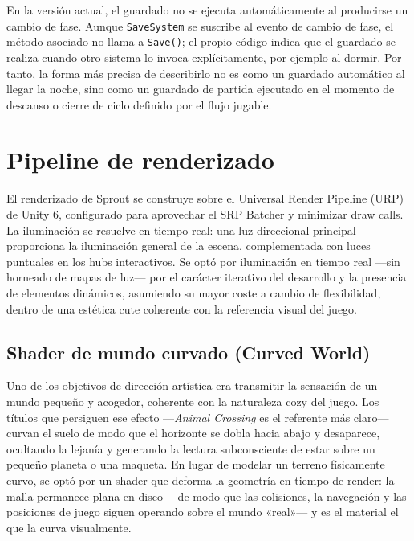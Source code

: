 \documentclass[12pt,twoside,titlepage]{report}
\begin{document}
En la versión actual, el guardado no se ejecuta automáticamente al producirse un cambio de fase. Aunque \texttt{SaveSystem} se suscribe al evento de cambio de fase, el método asociado no llama a \texttt{Save()}; el propio código indica que el guardado se realiza cuando otro sistema lo invoca explícitamente, por ejemplo al dormir. Por tanto, la forma más precisa de describirlo no es como un guardado automático al llegar la noche, sino como un guardado de partida ejecutado en el momento de descanso o cierre de ciclo definido por el flujo jugable.

\section{Pipeline de renderizado}

El renderizado de Sprout se construye sobre el Universal Render Pipeline (URP) de Unity 6, configurado para aprovechar el SRP Batcher y minimizar draw calls. La iluminación se resuelve en tiempo real: una luz direccional principal proporciona la iluminación general de la escena, complementada con luces puntuales en los hubs interactivos. Se optó por iluminación en tiempo real ---sin horneado de mapas de luz--- por el carácter iterativo del desarrollo y la presencia de elementos dinámicos, asumiendo su mayor coste a cambio de flexibilidad, dentro de una estética cute coherente con la referencia visual del juego.

\subsection{Shader de mundo curvado (Curved World)}

Uno de los objetivos de dirección artística era transmitir la sensación de un mundo pequeño y acogedor, coherente con la naturaleza cozy del juego. Los títulos que persiguen ese efecto ---\textit{Animal Crossing} es el referente más claro--- curvan el suelo de modo que el horizonte se dobla hacia abajo y desaparece, ocultando la lejanía y generando la lectura subconsciente de estar sobre un pequeño planeta o una maqueta. En lugar de modelar un terreno físicamente curvo, se optó por un shader que deforma la geometría en tiempo de render: la malla permanece plana en disco ---de modo que las colisiones, la navegación y las posiciones de juego siguen operando sobre el mundo «real»--- y es el material el que la curva visualmente.
\end{document}

